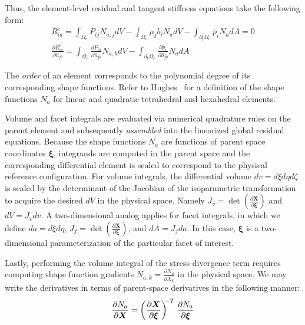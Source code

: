 Thus, the element-level residual and tangent stiffness equations take the following form:
\begin{gather}
R^e_{ia} = \int_{\Omega_e}P_{ij}N_{a,j}dV - \int_{\Omega_e}\rho_0b_iN_adV - \int_{\partial_t\Omega_e} \overline{p}_iN_adA = 0 \label{eqn:elr} \\[0.7em]
\frac{\partial R^e_{ia}}{\partial \hat{u}_{jb}} = \int_{\Omega_e}\frac{\partial P_{ik}}{\partial \hat{u}_{jb}}N_{a,k}dV - \int_{\partial_t\Omega_e}\frac{\partial \overline{p}_i}{\partial \hat{u}_{jb}}N_adA \label{eqn:elt}
\end{gather}

The \textit{order} of an element corresponds to the polynomial degree of its corresponding shape functions. Refer to Hughes~\cite{hughes_2000} for a definition of the shape functions $N_a$ for linear and quadratic tetrahedral and hexahedral elements. 

Volume and facet integrals are evaluated via numerical quadrature rules on the parent element and subsequently \textit{assembled} into the linearized global residual equations. Because the shape functions $N_a$ are functions of parent space coordinates $\bm{\xi}$, integrands are computed in the parent space and the corresponding differential element is scaled to correspond to the physical reference configuration. For volume integrals, the differential volume $dv = {d\xi}{d\eta}{d\zeta}$ is scaled by the determinant of the Jacobian of the isoparametric transformation to acquire the desired $dV$ in the physical space. Namely $J_v = \det(\frac{\partial{\bm{X}}}{\partial\bm{\xi}})$ and $dV = J_vdv$. A two-dimensional analog applies for facet integrals, in which we define $da = {d\xi}{d\eta}$, $J_f = \det(\frac{\partial{\bm{X}}}{\partial\bm{\xi}})$, and $dA = J_fda$. In this case, $\bm{\xi}$ is a two-dimensional parameterization of the particular facet of interest.

Lastly, performing the volume integral of the stress-divergence term requires computing shape function gradients $N_{a,k} = \frac{\partial N_a}{\partial X_k}$ in the physical space. We may write the derivatives in terms of parent-space derivatives in the following manner:
\begin{equation}
\frac{\partial N_a}{\partial \bm{X}} = \left(\frac{\partial \bm{X}}{\partial \bm{\xi}}\right)^{\hspace{-0.3em}-T} \hspace{0.05em} \frac{\partial N_a}{\partial \bm{\xi}}
\end{equation}

